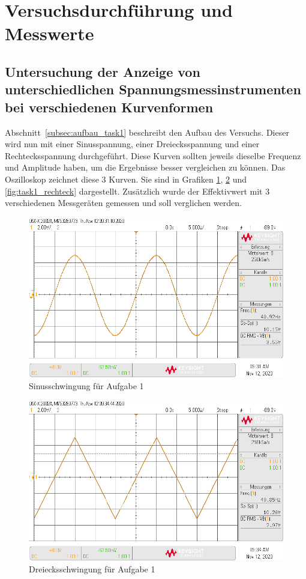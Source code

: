 \documentclass{article}
\begin{document}
\section{Versuchsdurchführung und Messwerte}

\subsection{Untersuchung  der  Anzeige  von  unterschiedlichen  Spannungsmessinstrumenten  bei verschiedenen Kurvenformen}

Abschnitt~\ref{subsec:aufbau_task1} beschreibt den Aufbau des Versuchs. Dieser wird nun mit einer Sinusspannung, einer Dreiecksspannung und einer Rechtecksspannung durchgeführt. Diese Kurven sollten jeweils dieselbe Frequenz und Amplitude haben, um die Ergebnisse besser vergleichen zu können. Das Oszilloskop zeichnet diese 3 Kurven. Sie sind in Grafiken \ref{fig:task1_sin}, \ref{fig:task1_dreieck} und \ref{fig:task1_rechteck} dargestellt. Zusätzlich wurde der Effektivwert mit 3 verschiedenen Messgeräten gemessen und soll verglichen werden.


\begin{figure}[H]
\centering
\caption{Sinusschwingung für Aufgabe 1}
\label{fig:task1_sin}
\includegraphics[scale=0.4]{daten/pul_1.png}
\end{figure}

\begin{figure}[H]
\centering
\caption{Dreiecksschwingung für Aufgabe 1}
\label{fig:task1_dreieck}
\includegraphics[scale=0.4]{daten/pul_2.png}
\end{figure}
\end{document}
